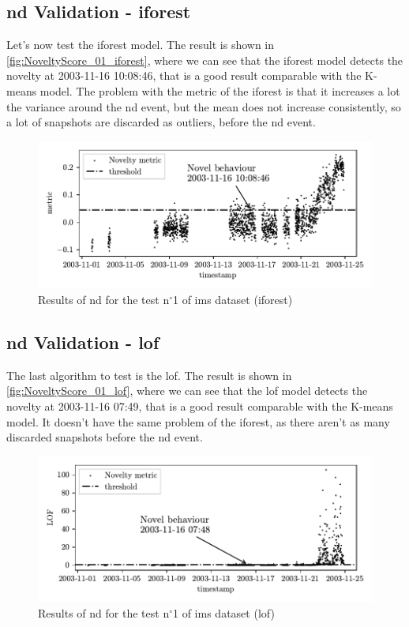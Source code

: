 \subsection{\gls{nd} Validation - \gls{iforest}}
Let's now test the \gls{iforest} model. The result is shown in \autoref{fig:NoveltyScore_01_iforest}, where we can see that the \gls{iforest} model detects the novelty at 2003-11-16 10:08:46, that is a good result comparable with the K-means model. The problem with the metric of the \gls{iforest} is that it increases a lot the variance around the \gls{nd} event, but the mean does not increase consistently, so a lot of snapshots are discarded as outliers, before the \gls{nd} event. 
\begin{figure}
    \centering
    \includegraphics{images/IMS/Novelty_01_500samples_bearing3x_iforest.pdf}
    \caption{Results of \gls{nd} for the test $\text{n}^\circ$1 of \gls{ims} dataset (\gls{iforest})}
    \label{fig:NoveltyScore_01_iforest}
\end{figure}

\subsection{\gls{nd} Validation - \gls{lof}}
The last algorithm to test is the \gls{lof}. The result is shown in \autoref{fig:NoveltyScore_01_lof}, where we can see that the \gls{lof} model detects the novelty at 2003-11-16 07:49, that is a good result comparable with the K-means model. It doesn't have the same problem of the \gls{iforest}, as there aren't as many discarded snapshots before the \gls{nd} event.

\begin{figure}
    \centering
    \includegraphics{images/IMS/Novelty_01_500samples_bearing3x_lof.pdf}
    \caption{Results of \gls{nd} for the test $\text{n}^\circ$1 of \gls{ims} dataset (\gls{lof})}
    \label{fig:NoveltyScore_01_lof}
\end{figure}

